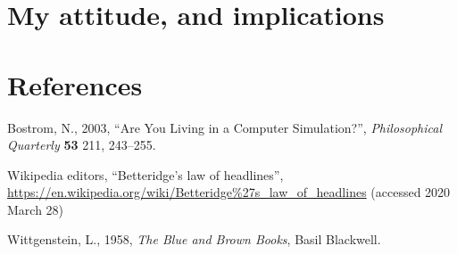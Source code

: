 \documentclass[12pt,letterpaper]{article}
\begin{document}
\section{My attitude, and implications}

\section*{References}
\begin{trivlist}
\item Bostrom, N., 2003, ``Are You Living in a Computer Simulation?'',
  \textit{Philosophical Quarterly} \textbf{53} 211, 243--255.
\item Wikipedia editors, ``Betteridge's law of headlines'',
  \url{https://en.wikipedia.org/wiki/Betteridge%27s_law_of_headlines}
    (accessed 2020 March 28)
\item Wittgenstein, L., 1958, \textit{The Blue and Brown Books},
  Basil Blackwell.
\end{trivlist}
\end{document}
